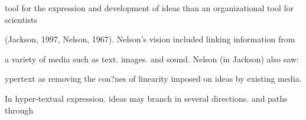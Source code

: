 \documentclass{book} %
\begin{document}
\begin{flushleft}
\noindent tool for the expression and development of ideas than an organizational tool for scientists

\noindent (Jackson, 1997, Nelson, 1967). Nelson's vision included linking information from

\noindent a variety of media such as text. images. and sound. Nelson (in Jackson) also saw:

\noindent 

\noindent [H]ypertext as removing the con?nes of linearity imposed on ideas by existing media.

\noindent In hyper-textual expression. ideas may branch in several directions. and paths through
\end{flushleft}
\end{document}

